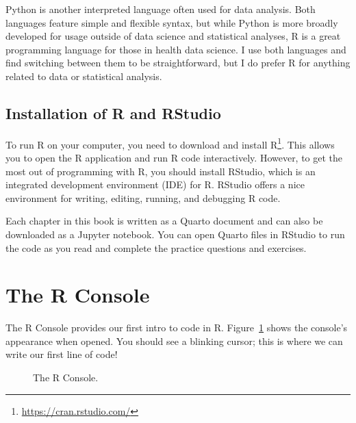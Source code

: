 \documentclass[
  letterpaper,
]{latex/krantz}
\renewcommand{\href}[2]{#2\footnote{\url{#1}}}
\begin{document}
Python is another interpreted language often used for data analysis.
Both languages feature simple and flexible syntax, but while Python is
more broadly developed for usage outside of data science and statistical
analyses, R is a great programming language for those in health data
science. I use both languages and find switching between them to be
straightforward, but I do prefer R for anything related to data or
statistical analysis.

\subsection{Installation of R and
RStudio}\label{installation-of-r-and-rstudio}

To run R on your computer, you need to download and install
\href{https://cran.rstudio.com/}{R}. This allows you to open the R
application and run R code interactively. However, to get the most out
of programming with R, you should install RStudio, which is an
integrated development environment (IDE) for R. RStudio offers a nice
environment for writing, editing, running, and debugging R code.

Each chapter in this book is written as a Quarto document and can also
be downloaded as a Jupyter notebook. You can open Quarto files in
RStudio to run the code as you read and complete the practice questions
and exercises.

\section{The R Console}\label{the-r-console}

The R Console  provides our first intro to code in R.
Figure~\ref{fig-r-console} shows the console's appearance when opened.
You should see a blinking cursor; this is where we can write our first
line of code!

\begin{figure}


\caption{\label{fig-r-console}The R Console.}

\end{figure}%
\end{document}
